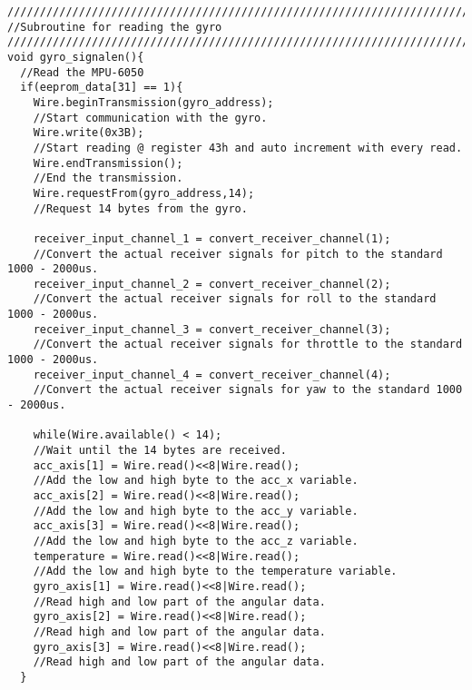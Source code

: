 \begin{lstlisting}
////////////////////////////////////////////////////////////////////////////////////////  
//Subroutine for reading the gyro
////////////////////////////////////////////////////////////////////////////////////////  
void gyro_signalen(){
  //Read the MPU-6050
  if(eeprom_data[31] == 1){
    Wire.beginTransmission(gyro_address);                                   
    //Start communication with the gyro.
    Wire.write(0x3B);                                                       
    //Start reading @ register 43h and auto increment with every read.
    Wire.endTransmission();                                                 
    //End the transmission.
    Wire.requestFrom(gyro_address,14);                                      
    //Request 14 bytes from the gyro.
    
    receiver_input_channel_1 = convert_receiver_channel(1);                 
    //Convert the actual receiver signals for pitch to the standard 1000 - 2000us.
    receiver_input_channel_2 = convert_receiver_channel(2);                 
    //Convert the actual receiver signals for roll to the standard 1000 - 2000us.
    receiver_input_channel_3 = convert_receiver_channel(3);                 
    //Convert the actual receiver signals for throttle to the standard 1000 - 2000us.
    receiver_input_channel_4 = convert_receiver_channel(4);                 
    //Convert the actual receiver signals for yaw to the standard 1000 - 2000us.
    
    while(Wire.available() < 14);                                           
    //Wait until the 14 bytes are received.
    acc_axis[1] = Wire.read()<<8|Wire.read();                               
    //Add the low and high byte to the acc_x variable.
    acc_axis[2] = Wire.read()<<8|Wire.read();                               
    //Add the low and high byte to the acc_y variable.
    acc_axis[3] = Wire.read()<<8|Wire.read();                               
    //Add the low and high byte to the acc_z variable.
    temperature = Wire.read()<<8|Wire.read();                               
    //Add the low and high byte to the temperature variable.
    gyro_axis[1] = Wire.read()<<8|Wire.read();                              
    //Read high and low part of the angular data.
    gyro_axis[2] = Wire.read()<<8|Wire.read();                              
    //Read high and low part of the angular data.
    gyro_axis[3] = Wire.read()<<8|Wire.read();                              
    //Read high and low part of the angular data.
  }


\end{lstlisting}
